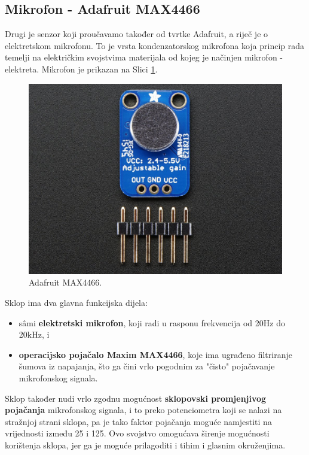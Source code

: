 \documentclass[12pt,a4paper]{article}
\begin{document}
	\newpage
	\subsection{Mikrofon - Adafruit MAX4466}
		Drugi je senzor koji proučavamo također od tvrtke Adafruit, a riječ je o elektretskom mikrofonu. To je vrsta kondenzatorskog mikrofona koja princip rada temelji na električkim svojstvima materijala od kojeg je načinjen mikrofon - elektreta. Mikrofon je prikazan na Slici \ref{fig:max4466}.

		\begin{figure}[h!]
			\includegraphics[width=\linewidth]{slike/4466.jpg}
			\caption{Adafruit MAX4466.\cite{max4466}}
			\label{fig:max4466}
		\end{figure}

		\par Sklop ima dva glavna funkcijska dijela:
		\begin{itemize}
			\item sâmi \textbf{elektretski mikrofon}, koji radi u rasponu frekvencija od 20Hz do 20kHz, i
			\item \textbf{operacijsko pojačalo Maxim MAX4466}, koje ima ugrađeno filtriranje šumova iz napajanja, što ga čini vrlo pogodnim za "čisto" pojačavanje mikrofonskog signala.
		\end{itemize}

		Sklop također nudi vrlo zgodnu mogućnost \textbf{sklopovski promjenjivog pojačanja} mikrofonskog signala, i to preko potenciometra koji se nalazi na stražnjoj strani sklopa, pa je tako faktor pojačanja moguće namjestiti na vrijednosti između 25 i 125. Ovo svojstvo omogućava širenje mogućnosti korištenja sklopa, jer ga je moguće prilagoditi i tihim i glasnim okruženjima.
\end{document}
